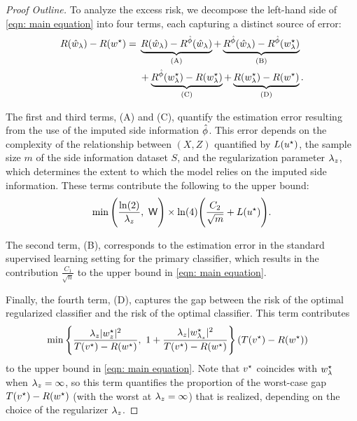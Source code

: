 \begin{proof}[Proof Outline]
To analyze the excess risk, we decompose the left-hand side of \eqref{eqn: main equation} into four terms, each capturing a distinct source of error:
\begin{equation*}
\begin{aligned}
    R(\hat{w}_\lambda) - R(w^\star) =\;&
    \underbrace{R(\hat{w}_\lambda) - R^{\hat{\phi}}(\hat{w}_\lambda)}_{\mathrm{(A)}} +
    \underbrace{R^{\hat{\phi}}(\hat{w}_\lambda) - R^{\hat{\phi}}(w^\star_{\lambda})}_{\mathrm{(B)}} \\
    &+ \underbrace{R^{\hat{\phi}}(w^\star_{\lambda}) - R(w^\star_{\lambda})}_{\mathrm{(C)}} +
    \underbrace{R(w^\star_{\lambda}) - R(w^\star)}_{\mathrm{(D)}}.
\end{aligned}
\end{equation*}

\noindent The first and third terms, (A) and (C), quantify the estimation error resulting from the use of the imputed side information $\hat{\phi}$. This error depends on the complexity of the relationship between $(X, Z)$ quantified by $L(u^\star)$, the sample size $m$ of the side information dataset $S$, and the regularization parameter $\lambda_z$, which determines the extent to which the model relies on the imputed side information. These terms contribute the following to the
upper bound:
\begin{equation*}
    \min\Bigg( \frac{\ln(2)}{\lambda_z},\ \mathsf{W} \Bigg)
    \times
    \ln(4)\Bigg( \frac{C_2}{\sqrt{m}} + L(u^\star) \Bigg).
\end{equation*}

\noindent The second term, (B), corresponds to the estimation error in the standard supervised learning setting for the primary classifier, which results in the contribution $    \frac{C_1}{\sqrt{n}}$
to the upper bound in \eqref{eqn: main equation}.

\noindent Finally, the fourth term, (D), captures the gap between the risk
of the optimal regularized classifier and the risk of the optimal classifier. This term contributes
\begin{equation*}
\begin{aligned}
    &\min\left\{\frac{\lambda_z |w^\star_z|^2}{T(v^\star) - R(w^\star)},\
    1 + \frac{\lambda_z |w^\star_{\lambda_z}|^2}{T(v^\star) - R(w^\star)}\right\}\left(T(v^\star) - R(w^\star)\right)
\end{aligned}
\end{equation*}
to the upper bound in \eqref{eqn: main equation}.
Note that $v^\star$ coincides with $w^\star_{\lambda}$ when $\lambda_z = \infty$, so this term quantifies the proportion of the worst-case gap $T(v^\star) - R(w^\star)$ (with the worst at $\lambda_z = \infty$) that is realized, depending on the choice of the regularizer $\lambda_z$.
\end{proof}

